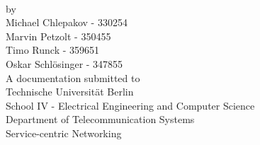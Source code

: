 \begin{titlepage}
	\strut
	\hfill
	\begin{center}
	\vspace{1cm}
		\Huge
		\begin{spacing}{.9}
			\textcolor{DarkRed}{\textbf{\projectName{} \projectVersion{}}}\\
		\end{spacing}
		\vspace{0.8cm}
		\large
		by\\
		\vspace{0.8cm}
		Michael Chlepakov - 330254 \\
		Marvin Petzolt - 350455 \\
		Timo Runck - 359651 \\
		Oskar Schl{\"o}singer - 347855 \\
		\vspace{2cm}
	 	A documentation submitted to\\
		\vspace{0.5cm}
		Technische Universität Berlin\\
		School IV - Electrical Engineering and Computer Science\\
		Department of Telecommunication Systems\\
		Service-centric Networking\\
		\vspace{0.5cm}

\end{center}
\end{titlepage}
